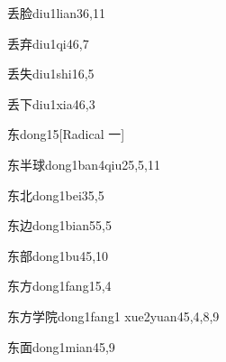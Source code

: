 \begin{verbete}{丢脸}{diu1lian3}{6,11}
\end{verbete}

\begin{verbete}{丢弃}{diu1qi4}{6,7}
\end{verbete}

\begin{verbete}{丢失}{diu1shi1}{6,5}
\end{verbete}

\begin{verbete}{丢下}{diu1xia4}{6,3}
\end{verbete}

\begin{verbete}{东}{dong1}{5}[Radical ⼀]
\end{verbete}

\begin{verbete}{东半球}{dong1ban4qiu2}{5,5,11}
\end{verbete}

\begin{verbete}{东北}{dong1bei3}{5,5}
\end{verbete}

\begin{verbete}{东边}{dong1bian5}{5,5}
\end{verbete}

\begin{verbete}{东部}{dong1bu4}{5,10}
\end{verbete}

\begin{verbete}{东方}{dong1fang1}{5,4}
\end{verbete}

\begin{verbete}{东方学院}{dong1fang1 xue2yuan4}{5,4,8,9}
\end{verbete}

\begin{verbete}{东面}{dong1mian4}{5,9}
\end{verbete}

